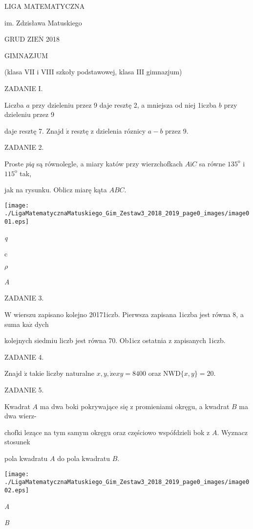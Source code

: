 \documentclass[a4paper,12pt]{article}
\begin{document}
LIGA MATEMATYCZNA

im. Zdzisława Matuskiego

GRUD Z$\mathrm{I}\mathrm{E}\acute{\mathrm{N}}$ 2018

GIMNAZJUM

(klasa VII i VIII szkoły podstawowej, klasa III gimnazjum)

ZADANIE I.

Liczba $a$ przy dzieleniu przez 9 daje resztę 2, a mniejsza od niej 1iczba $b$ przy dzieleniu przez 9

daje resztę 7. Znajd $\acute{\mathrm{z}}$ resztę z dzielenia róznicy $a-b$ przez 9.

ZADANIE 2.

Proste $p\mathrm{i}q$ są równolegle, a miary katów przy wierzchofkach $A\mathrm{i}C$ sa równe $135^{\mathrm{o}}$ i $115^{\mathrm{o}}$ tak,

jak na rysunku. Oblicz miarę kąta $ABC.$
\begin{center}
\texttt{[image: ./LigaMatematycznaMatuskiego\_Gim\_Zestaw3\_2018\_2019\_page0\_images/image001.eps]}
\end{center}
{\it q}

c

$\rho$

{\it A}

ZADANIE 3.

$\mathrm{W}$ wierszu zapisano kolejno 20171iczb. Pierwsza zapisana 1iczba jest równa 8, a suma $\mathrm{k}\mathrm{a}\dot{\mathrm{z}}$ dych

kolejnych siedmiu liczb jest równa 70. Ob1icz ostatnia z zapisanych 1iczb.

ZADANIE 4.

Znajd $\acute{\mathrm{z}}$ takie liczby naturalne $x, y, \dot{\mathrm{z}}\mathrm{e}xy=8400$ oraz $\mathrm{N}\mathrm{W}\mathrm{D}\{x,y\}=20.$

ZADANIE 5.

Kwadrat $A$ ma dwa boki pokrywające się z promieniami okręgu, a kwadrat $B$ ma dwa wierz-

chofki lezące na tym samym okręgu oraz częściowo wspófdzieli bok z $A$. Wyznacz stosunek

pola kwadratu $A$ do pola kwadratu $B.$
\begin{center}
\texttt{[image: ./LigaMatematycznaMatuskiego\_Gim\_Zestaw3\_2018\_2019\_page0\_images/image002.eps]}
\end{center}
{\it A}

{\it B}
\end{document}
